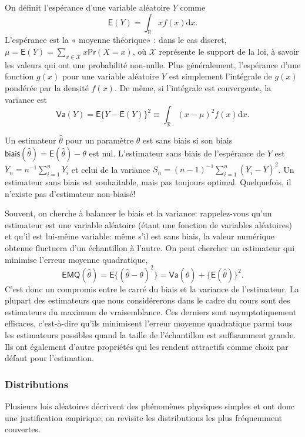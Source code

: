 \documentclass[
  11pt,
  letterpaper,
]{article}
\theoremstyle{definition}
\theoremstyle{definition}
\theoremstyle{definition}
\theoremstyle{remark}
\begin{document}
On définit l'espérance d'une variable aléatoire \(Y\) comme \[\mathsf{E}(Y)=\int_{\mathbb{R}} x f(x) \mathrm{d} x.\]
L'espérance est la « moyenne théorique» : dans le cas discret, \(\mu = \mathsf{E}(Y)=\sum_{x \in \mathcal{X}} x \mathsf{Pr}(X=x)\), où \(\mathcal{X}\) représente le support de la loi, à savoir les valeurs qui ont une probabilité non-nulle. Plus généralement, l'espérance d'une fonction \(g(x)\) pour une variable aléatoire \(Y\) est simplement l'intégrale de \(g(x)\) pondérée par la densité \(f(x)\). De même, si l'intégrale est convergente, la variance est
\[\mathsf{Va}(Y)=\mathsf{E}\{Y-\mathsf{E}(Y)\}^2 \equiv \int_{\mathbb{R}} (x-\mu)^2 f(x) \mathrm{d} x.\]

Un estimateur \(\hat{\theta}\) pour un paramètre \(\theta\) est sans biais si son biais \(\mathsf{biais}(\hat{\theta})=\mathsf{E}(\hat{\theta})- \theta\) est nul.
L'estimateur sans biais de l'espérance de \(Y\) est \(\overline{Y}_n = n^{-1} \sum_{i=1}^n Y_i\) et celui de la variance \(S_n = (n-1)^{-1} \sum_{i=1}^n (Y_i-\overline{Y})^2\). Un estimateur sans biais est souhaitable, mais pas toujours optimal. Quelquefois, il n'existe pas d'estimateur non-biaisé!

Souvent, on cherche à balancer le biais et la variance: rappelez-vous qu'un estimateur est une variable aléatoire (étant une fonction de variables aléatoires) et qu'il est lui-même variable: même s'il est sans biais, la valeur numérique obtenue fluctuera d'un échantillon à l'autre. On peut chercher un estimateur qui minimise l'erreur moyenne quadratique, \[\mathsf{EMQ}(\hat{\theta}) = \mathsf{E}\{(\hat{\theta}-\theta)^2\}=\mathsf{Va}(\hat{\theta}) + \{\mathsf{E}(\hat{\theta})\}^2.\]
C'est donc un compromis entre le carré du biais et la variance de l'estimateur.
La plupart des estimateurs que nous considérerons dans le cadre du cours sont
des estimateurs du maximum de vraisemblance. Ces derniers sont asymptotiquement efficaces, c'est-à-dire qu'ils minimisent l'erreur moyenne quadratique parmi tous les estimateurs possibles quand la taille de l'échantillon est suffisamment grande. Ils ont également d'autre propriétés qui les rendent attractifs comme choix par défaut pour l'estimation.

\hypertarget{distributions}{%
\subsubsection{Distributions}\label{distributions}}

Plusieurs lois aléatoires décrivent des phénomènes physiques simples et ont donc une justification empirique; on revisite les distributions les plus fréquemment couvertes.
\end{document}
